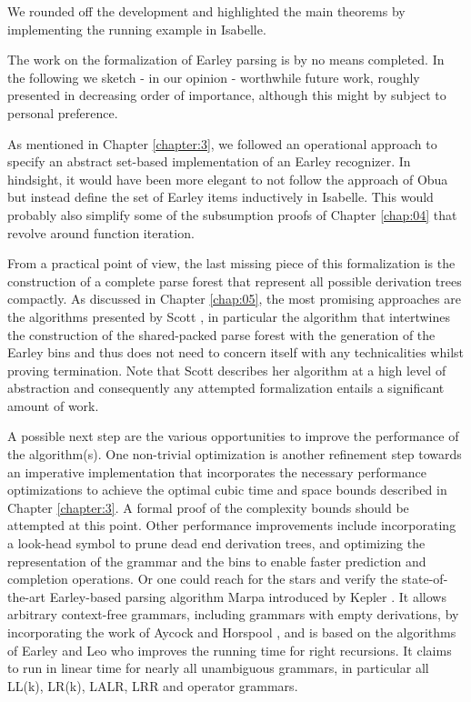 \begin{isabellebody}
\begin{isamarkuptext}
We rounded off the development and highlighted the main theorems by implementing the running example
in Isabelle.%
\end{isamarkuptext}\isamarkuptrue%
%
\isadelimdocument
%
\endisadelimdocument
%
\isatagdocument
%
\isamarkuptrue%
%
\endisatagdocument
{\isafolddocument}%
%
\isadelimdocument
%
\endisadelimdocument
%
\begin{isamarkuptext}%
The work on the formalization of Earley parsing is by no means completed. In the following
we sketch - in our opinion - worthwhile future work, roughly presented in decreasing order of importance,
although this might by subject to personal preference.

As mentioned in Chapter \ref{chapter:3}, we followed an operational approach to specify an abstract
set-based implementation of an Earley recognizer. In hindsight, it would have been more elegant to not
follow the approach of Obua but instead define the set of Earley items inductively in Isabelle. This
would probably also simplify some of the subsumption proofs of Chapter \ref{chap:04} that revolve around
function iteration.

From a practical point of view, the last missing piece of this formalization is the construction of a
complete parse forest that represent all possible derivation trees compactly. As discussed in Chapter \ref{chap:05},
the most promising approaches are the algorithms presented by Scott \cite{Scott:2008}, in particular
the algorithm that intertwines the construction of the shared-packed parse forest with the generation of
the Earley bins and thus does not need to concern itself with any technicalities whilst proving termination.
Note that Scott describes her algorithm at a high level of abstraction and consequently any attempted
formalization entails a significant amount of work.

A possible next step are the various opportunities to improve the performance of the algorithm(s).
One non-trivial optimization is another refinement step towards an imperative implementation that incorporates the
necessary performance optimizations to achieve the optimal cubic time and space bounds described in
Chapter \ref{chapter:3}. A formal proof of the complexity bounds should be attempted at this point.
Other performance improvements include incorporating a look-head symbol to prune dead end derivation
trees, and optimizing the representation of the grammar and the bins to enable faster prediction and
completion operations. Or one could reach for the stars and verify the state-of-the-art Earley-based
parsing algorithm Marpa introduced by Kepler \cite{Kegler:2023}. It allows arbitrary context-free
grammars, including grammars with empty derivations, by incorporating the work of Aycock and Horspool \cite{Aycock:2002},
and is based on the algorithms of Earley \cite{Earley:1970} and Leo \cite{Leo:1991} who improves
the running time for right recursions. It claims to run in linear time for nearly all unambiguous grammars,
in particular all LL(k), LR(k), LALR, LRR and operator grammars.


\end{isamarkuptext}
\end{isabellebody}
